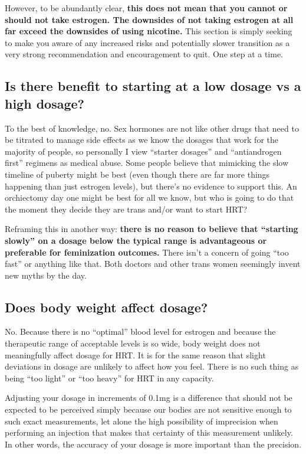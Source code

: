 \documentclass{article}
\begin{document}
However, to be abundantly clear, \textbf{this does not mean that you cannot or should not take estrogen. The downsides of not taking estrogen at all far exceed the downsides of using nicotine.} This section is simply seeking to make you aware of any increased risks and potentially slower transition as a very strong recommendation and encouragement to quit. One step at a time.

\subsection{Is there benefit to starting at a low dosage vs a high dosage?}

To the best of knowledge, no. Sex hormones are not like other drugs that need to be titrated to manage side effects as we know the dosages that work for the majority of people, so personally I view “starter dosages” and “antiandrogen first” regimens as medical abuse. Some people believe that mimicking the slow timeline of puberty might be best (even though there are far more things happening than just estrogen levels), but there’s no evidence to support this. An orchiectomy day one might be best for all we know, but who is going to do that the moment they decide they are trans and/or want to start HRT?

Reframing this in another way: \textbf{there is no reason to believe that “starting slowly” on a dosage below the typical range is advantageous or preferable for feminization outcomes.} There isn't a concern of going “too fast” or anything like that. Both doctors and other trans women seemingly invent new myths by the day. 

\subsection{Does body weight affect dosage?}

No. Because there is no “optimal” blood level for estrogen and because the therapeutic range of acceptable levels is so wide, body weight does not meaningfully affect dosage for HRT. It is for the same reason that slight deviations in dosage are unlikely to affect how you feel. There is no such thing as being “too light” or “too heavy” for HRT in any capacity.

Adjusting your dosage in increments of 0.1mg is a difference that should not be expected to be perceived simply because our bodies are not sensitive enough to such exact measurements, let alone the high possibility of imprecision when performing an injection that makes that certainty of this measurement unlikely. In other words, the accuracy of your dosage is more important than the precision.
\end{document}
